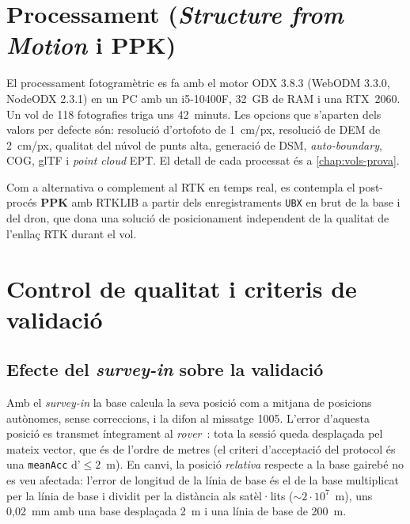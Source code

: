 
\section{Processament (\emph{Structure from Motion} i PPK)}
\label{sec:processament}

El processament fotogramètric es fa amb el motor ODX 3.8.3 (WebODM 3.3.0, NodeODX 2.3.1) en un PC amb un i5-10400F, 32~GB de RAM i una RTX~2060. Un vol de 118 fotografies triga uns 42~minuts. Les opcions que s'aparten dels valors per defecte són: resolució d'ortofoto de 1~cm/px, resolució de DEM de 2~cm/px, qualitat del núvol de punts alta, generació de DSM, \emph{auto-boundary}, COG, glTF i \emph{point cloud} EPT. El detall de cada processat és a \cref{chap:vols-prova}.

Com a alternativa o complement al RTK en temps real, es contempla el post-procés \textbf{PPK} amb RTKLIB a partir dels enregistraments \texttt{UBX} en brut de la base i del dron, que dona una solució de posicionament independent de la qualitat de l'enllaç RTK durant el vol.


\section{Control de qualitat i criteris de validació}
\label{sec:validacio}

\subsection{Efecte del \emph{survey-in} sobre la validació}
\label{subsec:efecte-surveyin}

Amb el \emph{survey-in} la base calcula la seva posició com a mitjana de posicions autònomes, sense correccions, i la difon al missatge 1005. L'error d'aquesta posició es transmet íntegrament al \emph{rover}~\cite{ublox_f9p_im}: tota la sessió queda desplaçada pel mateix vector, que és de l'ordre de metres (el criteri d'acceptació del protocol és una \texttt{meanAcc} d'$\leq 2$~m). En canvi, la posició \emph{relativa} respecte a la base gairebé no es veu afectada: l'error de longitud de la línia de base és el de la base multiplicat per la línia de base i dividit per la distància als satèl·lits ($\sim 2\cdot 10^{7}$~m), uns 0,02~mm amb una base desplaçada 2~m i una línia de base de 200~m.

